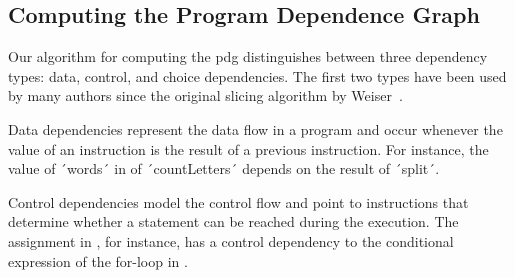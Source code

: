 %
%
%
%
%

\subsection{Computing the Program Dependence Graph}

Our algorithm for computing the \ac{pdg} distinguishes between three dependency types: data, control, and choice dependencies.
The first two types have been used by many authors since the original slicing algorithm by Weiser~\cite{weiser_81_program_slicing}.

Data dependencies represent the data flow in a program and occur whenever the value of an instruction is the result of a previous instruction.
For instance, the value of ´words´ in  of ´countLetters´ depends on the result of ´split´.

Control dependencies model the control flow and point to instructions that determine whether a statement can be reached during the execution.
The assignment in , for instance, has a control dependency to the conditional expression of the for-loop in .


